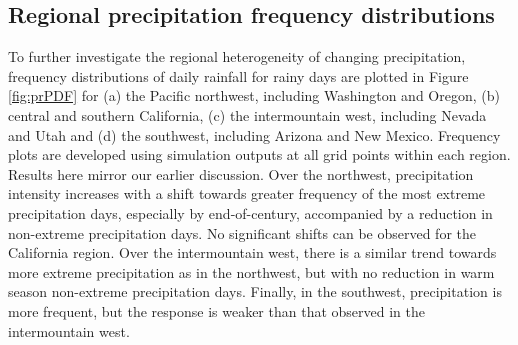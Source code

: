 \subsection{Regional precipitation frequency distributions}

To further investigate the regional heterogeneity of changing precipitation, frequency distributions of daily rainfall for rainy days are plotted in Figure \ref{fig:prPDF} for (a) the Pacific northwest, including Washington and Oregon, (b) central and southern California, (c) the intermountain west, including Nevada and Utah and (d) the southwest, including Arizona and New Mexico.  Frequency plots are developed using simulation outputs at all grid points within each region. Results here mirror our earlier discussion.  Over the northwest, precipitation intensity increases with a shift towards greater frequency of the most extreme precipitation days, especially by end-of-century, accompanied by a reduction in non-extreme precipitation days. No significant shifts can be observed for the California region. Over the intermountain west, there is a similar trend towards more extreme precipitation as in the northwest, but with no reduction in warm season non-extreme precipitation days. Finally, in the southwest, precipitation is more frequent, but the response is weaker than that observed in the intermountain west.

